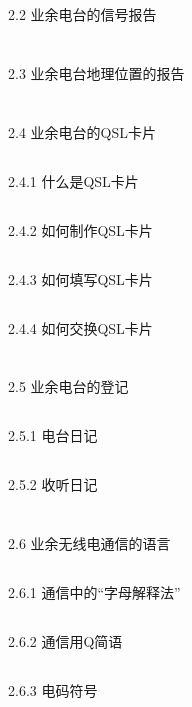 \documentclass[12pt,UTF8]{ctexbook}
\begin{document}
\section{}2.2 业余电台的信号报告
\section{}2.3 业余电台地理位置的报告
\section{}2.4 业余电台的QSL卡片
\subsection{}2.4.1 什么是QSL卡片
\subsection{}2.4.2 如何制作QSL卡片
\subsection{}2.4.3 如何填写QSL卡片
\subsection{}2.4.4 如何交换QSL卡片
\section{}2.5 业余电台的登记
\subsection{}2.5.1 电台日记
\subsection{}2.5.2 收听日记
\section{}2.6 业余无线电通信的语言
\subsection{}2.6.1 通信中的“字母解释法”
\subsection{}2.6.2 通信用Q简语
\subsection{}2.6.3 电码符号
\end{document}
